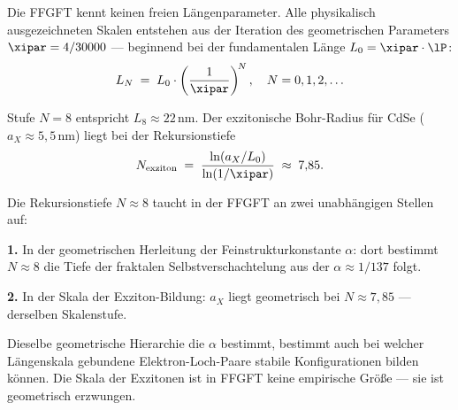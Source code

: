 Die FFGFT kennt keinen freien Längenparameter.
Alle physikalisch ausgezeichneten Skalen entstehen aus der
Iteration des geometrischen Parameters $\xipar = 4/30000$
--- beginnend bei der fundamentalen Länge
$L_0 = \xipar \cdot \lP$:
\begin{equation}
  L_N \;=\; L_0 \cdot \left(\frac{1}{\xipar}\right)^{\!N},
  \quad N = 0, 1, 2, \ldots
\end{equation}

\begin{center}
\end{center}

Stufe $N = 8$ entspricht $L_8 \approx 22$\,nm.
Der exzitonische Bohr-Radius für CdSe ($a_X \approx 5{,}5$\,nm)
liegt bei der Rekursionstiefe
\begin{equation}
  N_{\text{exziton}} \;=\;
  \frac{\ln(a_X / L_0)}{\ln(1/\xipar)} \;\approx\; 7{,}85.
\end{equation}

\begin{foundation}
Die Rekursionstiefe $N \approx 8$ taucht in der FFGFT
an zwei unabhängigen Stellen auf:

\textbf{1.} In der geometrischen Herleitung der Feinstrukturkonstante $\alpha$:
dort bestimmt $N \approx 8$ die Tiefe der fraktalen Selbstverschachtelung
aus der $\alpha \approx 1/137$ folgt.

\textbf{2.} In der Skala der Exziton-Bildung: $a_X$ liegt geometrisch
bei $N \approx 7{,}85$ --- derselben Skalenstufe.

Dieselbe geometrische Hierarchie die $\alpha$ bestimmt,
bestimmt auch bei welcher Längenskala gebundene
Elektron-Loch-Paare stabile Konfigurationen bilden können.
Die Skala der Exzitonen ist in FFGFT keine empirische Größe ---
sie ist geometrisch erzwungen.
\end{foundation}

